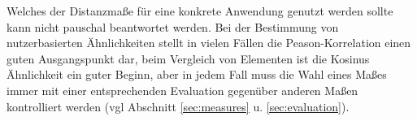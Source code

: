 Welches der Distanzmaße für eine konkrete Anwendung genutzt werden sollte kann nicht pauschal beantwortet werden. Bei der Bestimmung von nutzerbasierten Ähnlichkeiten stellt in vielen Fällen die Peason-Korrelation einen guten Ausgangspunkt dar, beim Vergleich von Elementen ist die Kosinus Ähnlichkeit ein guter Beginn, aber in jedem Fall muss die Wahl eines Maßes immer mit einer entsprechenden Evaluation gegenüber anderen Maßen kontrolliert werden (vgl Abschnitt \ref{sec:measures} u. \ref{sec:evaluation}).

